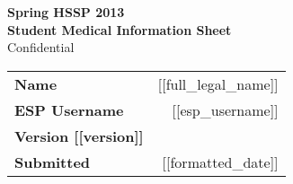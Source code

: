 \documentclass{article}
\begin{document}
\thispagestyle{firstfooter}	%
\rule[-3ex]{0pt}{3ex}		%

\begin{center}
{\large \textbf{Spring HSSP 2013 \\
Student Medical Information Sheet}} \\
{\sc Confidential} \\[5mm]

\begin{tabular}{l r}
\textbf{Name } & [[full_legal_name]] \\[-0.5mm]
\textbf{ESP Username } & [[esp_username]] \\[2mm]
\textbf{Version [[version]] } &  \\[-0.5mm]
\textbf{Submitted } & [[formatted_date]] \\
\end{tabular}
\end{center}

\vspace{1cm}
\end{document}
